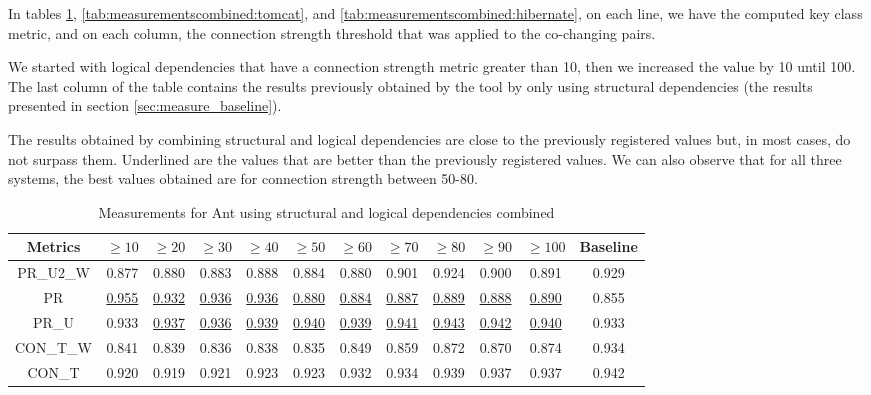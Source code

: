 \documentclass[runningheads]{comsis2}
\begin{document}
In tables \ref{tab:measurementscombined:ant}, \ref{tab:measurementscombined:tomcat}, and \ref{tab:measurementscombined:hibernate}, on each line, we have the computed key class metric, and on each column, the connection strength threshold that was applied to the co-changing pairs.

We started with logical dependencies that have a connection strength metric greater than 10, then we increased the value by 10 until 100. The last column of the table contains the results previously obtained by the tool by only using structural dependencies (the results presented in section \ref{sec:measure_baseline}).


The results obtained by combining structural and logical dependencies are close to the previously registered values but, in most cases, do not surpass them. Underlined are the values that are better than the previously registered values. We can also observe that for all three systems, the best values obtained are for connection strength between 50-80.

\begin{table}[!h]
\setlength\tabcolsep{3.5pt}
\caption{Measurements for Ant using structural and logical dependencies combined}
\label{tab:measurementscombined:ant}
\centering
\begin{tabular}{|c|cccccccccc|c|}
\hline
Metrics &	$\geq10$	&	$\geq20$		&	$\geq30$		&	$\geq40$		&	$\geq50$		&	$\geq60$		&	$\geq70$		&	$\geq80$		&	$\geq90$		&	$\geq100$		&	Baseline \\
\hline

PR\_U2\_W	&	0.877	&	0.880	&	0.883	&	0.888	&	0.884	&	0.880	&	0.901	&	0.924	&	0.900	&	0.891	&	0.929	\\
PR	&	\underline{0.955}	&	\underline{0.932}	&	\underline{0.936}	&	\underline{0.936}	&	\underline{0.880}	&	\underline{0.884}	&	\underline{0.887}	&	\underline{0.889}	&	\underline{0.888}	&	\underline{0.890}	&	0.855	\\
PR\_U	&	0.933	&	\underline{0.937}	&	\underline{0.936}	&	\underline{0.939}	&	\underline{0.940}	&	\underline{0.939}	&	\underline{0.941}	&	\underline{0.943}	&	\underline{0.942}	&	\underline{0.940}	&	0.933	\\
CON\_T\_W	&	0.841	&	0.839	&	0.836	&	0.838	&	0.835	&	0.849	&	0.859	&	0.872	&	0.870	&	0.874	&	0.934	\\
CON\_T	&	0.920	&	0.919	&	0.921	&	0.923	&	0.923	&	0.932	&	0.934	&	0.939	&	0.937	&	0.937	&	0.942	\\

\hline
\end{tabular}
\end{table}
\end{document}

